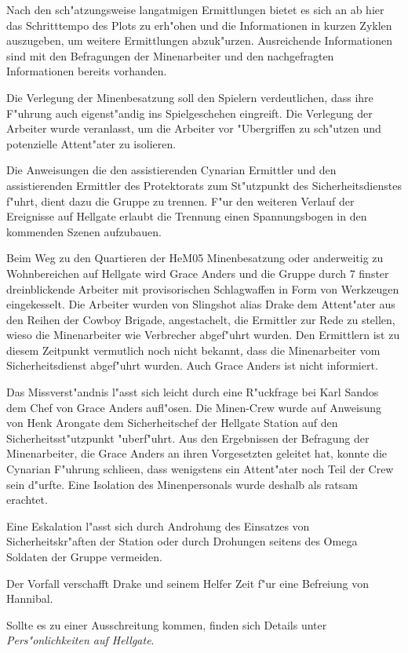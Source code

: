 \begin{remarks}
	Nach den sch"atzungsweise langatmigen Ermittlungen bietet es sich an ab hier das Schritttempo des Plots zu erh"ohen und die Informationen in kurzen Zyklen auszugeben, um weitere Ermittlungen abzuk"urzen. Ausreichende Informationen sind mit den Befragungen der Minenarbeiter und den nachgefragten Informationen bereits vorhanden.

	Die Verlegung der Minenbesatzung soll den Spielern verdeutlichen, dass ihre F"uhrung auch eigenst"andig ins Spielgeschehen eingreift. Die Verlegung der Arbeiter wurde veranlasst, um die Arbeiter vor "Ubergriffen zu sch"utzen und potenzielle Attent"ater zu isolieren.

	Die Anweisungen die den assistierenden Cynarian Ermittler und den assistierenden Ermittler des Protektorats zum St"utzpunkt des Sicherheitsdienstes f"uhrt, dient dazu die Gruppe zu trennen. F"ur den weiteren Verlauf der Ereignisse auf Hellgate erlaubt die Trennung einen Spannungsbogen in den kommenden Szenen aufzubauen.
\end{remarks}


Beim Weg zu den Quartieren der HeM05 Minenbesatzung oder anderweitig zu Wohnbereichen auf Hellgate wird Grace Anders und die Gruppe durch 7 finster dreinblickende Arbeiter mit provisorischen Schlagwaffen in Form von Werkzeugen eingekesselt. Die Arbeiter wurden von Slingshot alias Drake dem Attent"ater aus den Reihen der Cowboy Brigade, angestachelt, die Ermittler zur Rede zu stellen, wieso die Minenarbeiter wie Verbrecher abgef"uhrt wurden. Den Ermittlern ist zu diesem Zeitpunkt vermutlich noch nicht bekannt, dass die Minenarbeiter vom Sicherheitsdienst abgef"uhrt wurden. Auch Grace Anders ist nicht informiert.

\begin{remarks}
	Das Missverst"andnis l"asst sich leicht durch eine R"uckfrage bei Karl Sandos dem Chef von Grace Anders aufl"osen. Die Minen-Crew wurde auf Anweisung von Henk Arongate dem Sicherheitschef der Hellgate Station auf den Sicherheitsst"utzpunkt "uberf"uhrt. Aus den Ergebnissen der Befragung der Minenarbeiter, die Grace Anders an ihren Vorgesetzten geleitet hat, konnte die Cynarian F"uhrung schlie\3en, dass wenigstens ein Attent"ater noch Teil der Crew sein d"urfte. Eine Isolation des Minenpersonals wurde deshalb als ratsam erachtet.

	Eine Eskalation l"asst sich durch Androhung des Einsatzes von Sicherheitskr"aften der Station oder durch Drohungen seitens des Omega Soldaten der Gruppe vermeiden. 

	Der Vorfall verschafft Drake und seinem Helfer Zeit f"ur eine Befreiung von Hannibal.
	
	Sollte es zu einer Ausschreitung kommen, finden sich Details unter \emph{Pers"onlichkeiten auf Hellgate}.
\end{remarks}

